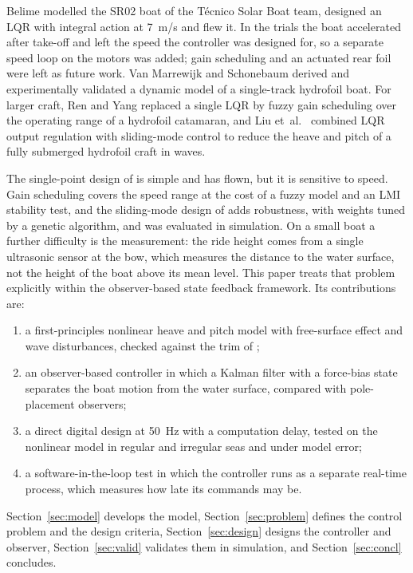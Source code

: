 \documentclass[conference]{IEEEtran}
\begin{document}
Belime \cite{belime} modelled the SR02 boat of the T\'ecnico Solar Boat team,
designed an LQR with integral action at \SI{7}{m/s} and flew it. In the trials
the boat accelerated after take-off and left the speed the controller was
designed for, so a separate speed loop on the motors was added; gain scheduling
and an actuated rear foil were left as future work. Van Marrewijk and
Schonebaum \cite{marrewijk} derived and experimentally validated a dynamic model
of a single-track hydrofoil boat. For larger craft, Ren and Yang \cite{renyang}
replaced a single LQR by fuzzy gain scheduling over the operating range of a
hydrofoil catamaran, and Liu et~al.\ \cite{liu} combined LQR output regulation
with sliding-mode control to reduce the heave and pitch of a fully submerged
hydrofoil craft in waves.

The single-point design of \cite{belime} is simple and has flown, but it is
sensitive to speed. Gain scheduling \cite{renyang} covers the speed range at the
cost of a fuzzy model and an LMI stability test, and the sliding-mode design of
\cite{liu} adds robustness, with weights tuned by a genetic algorithm, and was
evaluated in simulation. On a small boat a further difficulty is the measurement: the
ride height comes from a single ultrasonic sensor at the bow, which measures the
distance to the water surface, not the height of the boat above its mean level.
This paper treats that problem explicitly within the observer-based state
feedback framework. Its
contributions are:
\begin{enumerate}
\item a first-principles nonlinear heave and pitch model with free-surface
      effect and wave disturbances, checked against the trim of \cite{belime};
\item an observer-based controller in which a Kalman filter with a force-bias
      state separates the boat motion from the water surface, compared with
      pole-placement observers;
\item a direct digital design at \SI{50}{Hz} with a computation delay, tested on
      the nonlinear model in regular and irregular seas and under model error;
\item a software-in-the-loop test in which the controller runs as a separate
      real-time process, which measures how late its commands may be.
\end{enumerate}
Section~\ref{sec:model} develops the model, Section~\ref{sec:problem} defines
the control problem and the design criteria, Section~\ref{sec:design} designs
the controller and observer, Section~\ref{sec:valid} validates them in
simulation, and Section~\ref{sec:concl} concludes.
\end{document}
